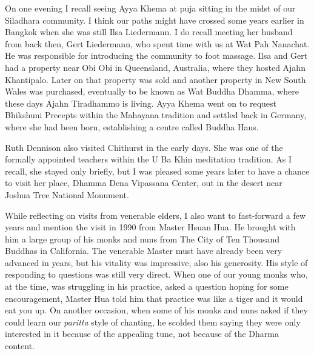 On one evening I recall seeing Ayya Khema\cite{khema}
at puja sitting in the midst of our Siladhara community. I
think our paths might have crossed some years earlier in Bangkok when
she was still Ilsa Liedermann. I do recall meeting her husband from back
then, Gert Liedermann, who spent time with us at Wat Pah Nanachat. He
was responsible for introducing the community to foot massage. Ilsa and
Gert had a property near Obi Obi in Queensland, Australia, where they
hosted Ajahn Khantipalo. Later on that property was sold and another
property in New South Wales was purchased, eventually to be known as Wat
Buddha Dhamma, where these days Ajahn Tiradhammo is living. Ayya Khema
went on to request Bhikshuni Precepts within the Mahayana tradition and
settled back in Germany, where she had been born, establishing a centre
called Buddha Haus\cite{buddha-haus}.

Ruth Dennison\cite{dennison}
also visited Chithurst in the early days. She was
one of the formally appointed teachers within the U Ba Khin meditation
tradition. As I recall, she stayed only briefly, but I was pleased some
years later to have a chance to visit her place, Dhamma Dena Vipassana
Center, out in the desert near Joshua Tree National Monument\cite{joshua}.

While reflecting on visits from venerable elders, I also want to
fast-forward a few years and mention the visit in 1990 from Master Hsuan
Hua. He brought with him a large group of his monks and nuns from
The City of Ten Thousand Buddhas\cite{ten-thousand}
in California. The venerable Master must have already
been very advanced in years, but his vitality was impressive, also his
generosity. His style of responding to questions was still very direct.
When one of our young monks who, at the time, was struggling in his
practice, asked a question hoping for some encouragement, Master Hua
told him that practice was like a tiger and it would eat you up. On
another occasion, when some of his monks and nuns asked if they could
learn our \emph{paritta} style of chanting, he scolded them saying they
were only interested in it because of the appealing tune, not because of
the Dharma content.

